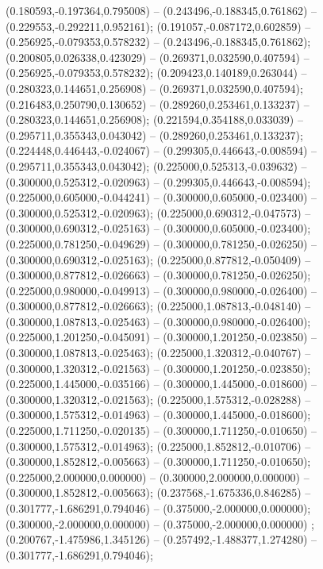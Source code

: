  (0.180593,-0.197364,0.795008) -- (0.243496,-0.188345,0.761862) -- (0.229553,-0.292211,0.952161);
 (0.191057,-0.087172,0.602859) -- (0.256925,-0.079353,0.578232) -- (0.243496,-0.188345,0.761862);
 (0.200805,0.026338,0.423029) -- (0.269371,0.032590,0.407594) -- (0.256925,-0.079353,0.578232);
 (0.209423,0.140189,0.263044) -- (0.280323,0.144651,0.256908) -- (0.269371,0.032590,0.407594);
 (0.216483,0.250790,0.130652) -- (0.289260,0.253461,0.133237) -- (0.280323,0.144651,0.256908);
 (0.221594,0.354188,0.033039) -- (0.295711,0.355343,0.043042) -- (0.289260,0.253461,0.133237);
 (0.224448,0.446443,-0.024067) -- (0.299305,0.446643,-0.008594) -- (0.295711,0.355343,0.043042);
 (0.225000,0.525313,-0.039632) -- (0.300000,0.525312,-0.020963) -- (0.299305,0.446643,-0.008594);
 (0.225000,0.605000,-0.044241) -- (0.300000,0.605000,-0.023400) -- (0.300000,0.525312,-0.020963);
 (0.225000,0.690312,-0.047573) -- (0.300000,0.690312,-0.025163) -- (0.300000,0.605000,-0.023400);
 (0.225000,0.781250,-0.049629) -- (0.300000,0.781250,-0.026250) -- (0.300000,0.690312,-0.025163);
 (0.225000,0.877812,-0.050409) -- (0.300000,0.877812,-0.026663) -- (0.300000,0.781250,-0.026250);
 (0.225000,0.980000,-0.049913) -- (0.300000,0.980000,-0.026400) -- (0.300000,0.877812,-0.026663);
 (0.225000,1.087813,-0.048140) -- (0.300000,1.087813,-0.025463) -- (0.300000,0.980000,-0.026400);
 (0.225000,1.201250,-0.045091) -- (0.300000,1.201250,-0.023850) -- (0.300000,1.087813,-0.025463);
 (0.225000,1.320312,-0.040767) -- (0.300000,1.320312,-0.021563) -- (0.300000,1.201250,-0.023850);
 (0.225000,1.445000,-0.035166) -- (0.300000,1.445000,-0.018600) -- (0.300000,1.320312,-0.021563);
 (0.225000,1.575312,-0.028288) -- (0.300000,1.575312,-0.014963) -- (0.300000,1.445000,-0.018600);
 (0.225000,1.711250,-0.020135) -- (0.300000,1.711250,-0.010650) -- (0.300000,1.575312,-0.014963);
 (0.225000,1.852812,-0.010706) -- (0.300000,1.852812,-0.005663) -- (0.300000,1.711250,-0.010650);
 (0.225000,2.000000,0.000000) -- (0.300000,2.000000,0.000000) -- (0.300000,1.852812,-0.005663);
 (0.237568,-1.675336,0.846285) -- (0.301777,-1.686291,0.794046) -- (0.375000,-2.000000,0.000000);
 (0.300000,-2.000000,0.000000) -- (0.375000,-2.000000,0.000000) ;
 (0.200767,-1.475986,1.345126) -- (0.257492,-1.488377,1.274280) -- (0.301777,-1.686291,0.794046);
